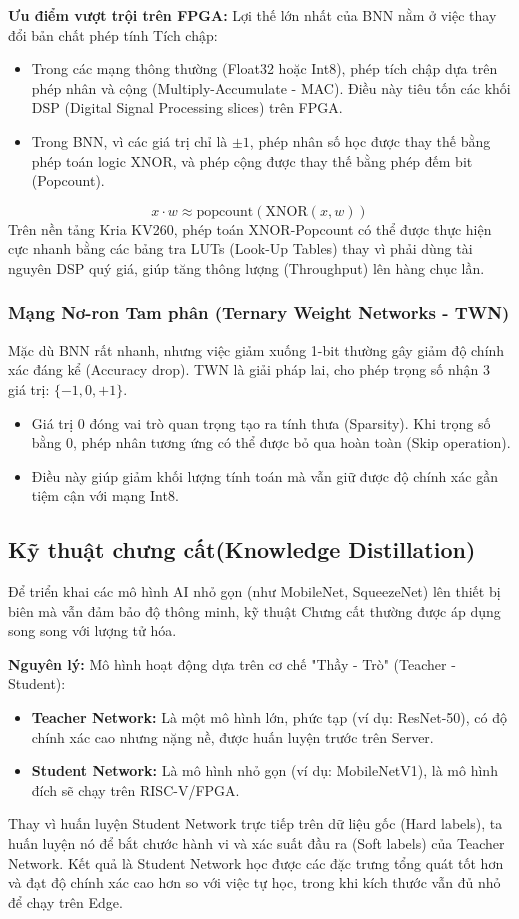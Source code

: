 \textbf{Ưu điểm vượt trội trên FPGA:}
Lợi thế lớn nhất của BNN nằm ở việc thay đổi bản chất phép tính Tích chập:
\begin{itemize}
    \item Trong các mạng thông thường (Float32 hoặc Int8), phép tích chập dựa trên phép nhân và cộng (Multiply-Accumulate - MAC). Điều này tiêu tốn các khối DSP (Digital Signal Processing slices) trên FPGA.
    \item Trong BNN, vì các giá trị chỉ là $\pm 1$, phép nhân số học được thay thế bằng phép toán logic XNOR, và phép cộng được thay thế bằng phép đếm bit (Popcount).
\end{itemize}
\begin{equation}
x \cdot w \approx \text{popcount}(\text{XNOR}(x, w))
\end{equation}
Trên nền tảng Kria KV260, phép toán XNOR-Popcount có thể được thực hiện cực nhanh bằng các bảng tra LUTs (Look-Up Tables) thay vì phải dùng tài nguyên DSP quý giá, giúp tăng thông lượng (Throughput) lên hàng chục lần.

\subsubsection{Mạng Nơ-ron Tam phân (Ternary Weight Networks - TWN)}
Mặc dù BNN rất nhanh, nhưng việc giảm xuống 1-bit thường gây giảm độ chính xác đáng kể (Accuracy drop). TWN là giải pháp lai, cho phép trọng số nhận 3 giá trị: $\{-1, 0, +1\}$.
\begin{itemize}
    \item Giá trị $0$ đóng vai trò quan trọng tạo ra tính thưa (Sparsity). Khi trọng số bằng 0, phép nhân tương ứng có thể được bỏ qua hoàn toàn (Skip operation).
    \item Điều này giúp giảm khối lượng tính toán mà vẫn giữ được độ chính xác gần tiệm cận với mạng Int8.
\end{itemize}

\subsection{Kỹ thuật chưng cất(Knowledge Distillation)}
Để triển khai các mô hình AI nhỏ gọn (như MobileNet, SqueezeNet) lên thiết bị biên mà vẫn đảm bảo độ thông minh, kỹ thuật Chưng cất thường được áp dụng song song với lượng tử hóa.

\textbf{Nguyên lý:}
Mô hình hoạt động dựa trên cơ chế "Thầy - Trò" (Teacher - Student):
\begin{itemize}
    \item \textbf{Teacher Network:} Là một mô hình lớn, phức tạp (ví dụ: ResNet-50), có độ chính xác cao nhưng nặng nề, được huấn luyện trước trên Server.
    \item \textbf{Student Network:} Là mô hình nhỏ gọn (ví dụ: MobileNetV1), là mô hình đích sẽ chạy trên RISC-V/FPGA.
\end{itemize}
Thay vì huấn luyện Student Network trực tiếp trên dữ liệu gốc (Hard labels), ta huấn luyện nó để bắt chước hành vi và xác suất đầu ra (Soft labels) của Teacher Network. Kết quả là Student Network học được các đặc trưng tổng quát tốt hơn và đạt độ chính xác cao hơn so với việc tự học, trong khi kích thước vẫn đủ nhỏ để chạy trên Edge.

